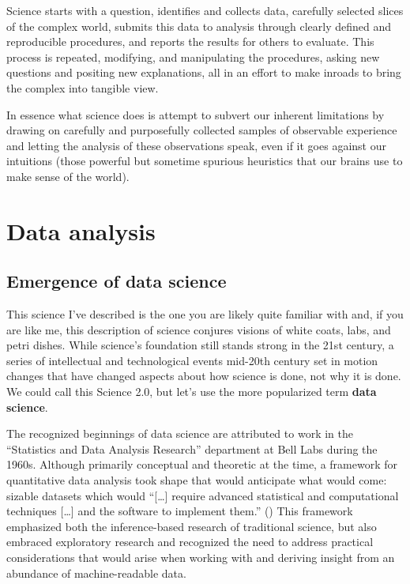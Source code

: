 \documentclass[
  letterpaper,
  krantz1]{latex/krantz-mod}
\theoremstyle{definition}
\theoremstyle{definition}
\theoremstyle{remark}
\begin{document}
Science starts with a question, identifies and collects
data, carefully selected slices of the complex world, submits this data
to analysis through clearly defined and reproducible procedures, and
reports the results for others to evaluate. This process is repeated,
modifying, and manipulating the procedures, asking new questions and
positing new explanations, all in an effort to make inroads to bring the
complex into tangible view.

In essence what science does is attempt to subvert our inherent
limitations by drawing on carefully and purposefully collected
samples of observable experience and letting the analysis
of these observations speak, even if it goes against our intuitions
(those powerful but sometime spurious heuristics that our brains use to
make sense of the world).

\section{Data analysis}\label{data-analysis}

\subsection{Emergence of data science}\label{emergence-of-data-science}

This science I've described is the one you are likely quite familiar
with and, if you are like me, this description of science conjures
visions of white coats, labs, and petri dishes. While science's
foundation still stands strong in the 21st century, a series of
intellectual and technological events mid-20th century set in motion
changes that have changed aspects about how science is done, not why it
is done. We could call this Science 2.0, but let's use the more
popularized term \textbf{data science}.

The recognized beginnings of data science are attributed to work in the
``Statistics and Data Analysis Research'' department at
Bell Labs during the 1960s. Although primarily
conceptual and theoretic at the time, a framework for
quantitative data analysis took shape
that would anticipate what would come: sizable datasets which would
``{[}\ldots{]} require advanced statistical and computational techniques
{[}\ldots{]} and the software to implement them.''
() This framework emphasized
both the inference-based research of traditional science, but also
embraced exploratory research and recognized the need to address
practical considerations that would arise when working with and deriving
insight from an abundance of machine-readable data.
\end{document}
